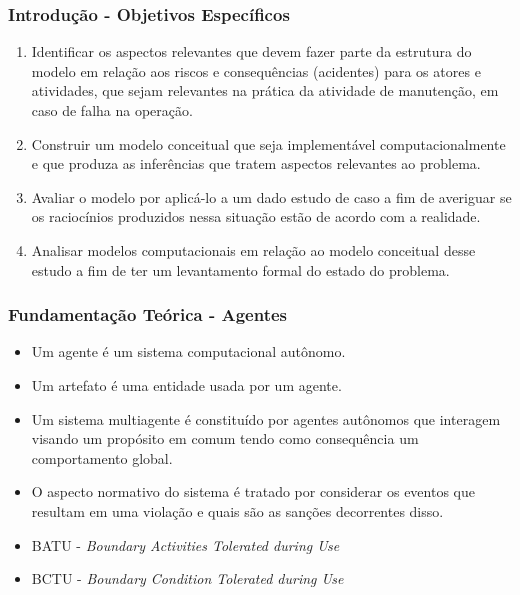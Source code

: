 \documentclass{beamer}
\begin{document}
\begin{frame}
\frametitle{Introdução - Objetivos Específicos}
	\begin{enumerate}
    	\item Identificar os aspectos relevantes que devem fazer parte da estrutura do modelo em relação aos 	riscos e consequências (acidentes) para os atores e atividades, que sejam relevantes na prática da 	atividade de manutenção, em caso de falha na operação. 
    	\item Construir um modelo conceitual que seja implementável computacionalmente e que produza as 	inferências que tratem aspectos relevantes ao problema.
    	\item Avaliar o modelo por aplicá-lo a um dado estudo de caso a fim de averiguar se os raciocínios 	produzidos nessa situação estão de acordo com a realidade.  
    	\item Analisar modelos computacionais em relação ao modelo conceitual desse estudo a fim de ter um 	levantamento formal do estado do problema. 
	\end{enumerate}
\end{frame}


\begin{frame}
\frametitle{Fundamentação Teórica - Agentes}
	\begin{itemize}
		\item Um agente é um sistema computacional autônomo. 
		\item Um artefato é uma entidade usada por um agente. 
		\item Um sistema multiagente é constituído por agentes autônomos que interagem visando um propósito em comum tendo como consequência um comportamento global.
		\item O aspecto normativo do sistema é tratado por considerar os eventos que resultam em uma violação e quais são as sanções decorrentes disso.
		\item BATU - \textit{Boundary Activities Tolerated during Use}
		\item BCTU - \textit{Boundary Condition Tolerated during Use} 				 
	\end{itemize}
\end{frame}
\end{document}
